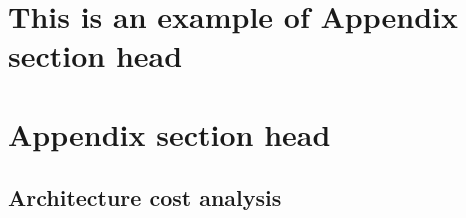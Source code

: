 \documentclass[prodmode,acmtosem]{acmsmall} %
\begin{document}




\elecappendix

\medskip

\section{This is an example of Appendix section head}


\section{Appendix section head}

\subsection{Architecture cost analysis}
\label{ArchitectureCost}
\end{document}

